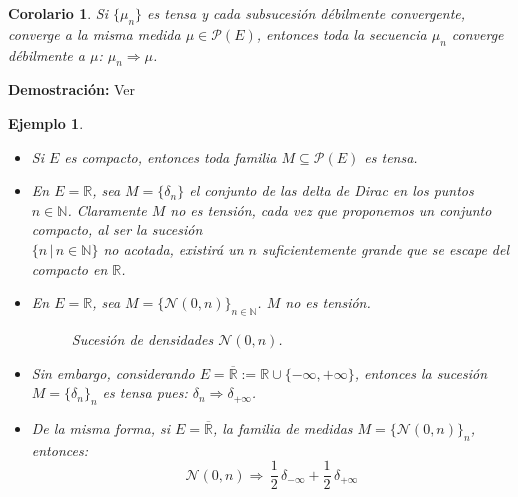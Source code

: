 \documentclass[a4paper]{article}
\newtheorem{ejemplo}{Ejemplo}
\newtheorem{cor}{Corolario}
\numberwithin{equation}{subsection}
\def\R{\mathbb R}
\def\N{\mathbb N}
\begin{document}
\begin{cor} Si $\{\mu_n\}$ es tensa y cada subsucesión débilmente convergente, converge a la misma medida $\mu\in\mathcal{P}(E)$, entonces toda la secuencia $\mu_n$ converge débilmente a $\mu$: $\mu_n \Rightarrow \mu$.
\end{cor}
\textbf{Demostración:} Ver \cite[págs. 59,69]{Bill}
\begin{ejemplo}
\begin{itemize}
    \item Si $E$ es compacto, entonces toda familia $M\subseteq \mathcal{P}(E)$ es tensa.
    \item En $E=\R$, sea $M=\{\delta_n \}$ el conjunto de las delta de Dirac en los puntos $n\in\N$. Claramente $M$ no es tensión, cada vez que proponemos un conjunto compacto, al ser la sucesión \\$\{n\,|\, n\in\N\}$ no acotada, existirá un $n$ suficientemente grande que se escape del compacto en $\R$. 
    \item En $E=\R$, sea $M=\{\mathcal{N}(0,n)\}_{n\in\N}$. $M$ no es tensión.
\begin{figure}[h!]
\centering
    \caption{Sucesión de densidades $\mathcal{N}(0,n)$.}
\end{figure}

    \item Sin embargo, considerando $E=\overline{\R}:=\R\cup \{-\infty ,+\infty\}$, entonces la sucesión $M=\{\delta_n \}_n$ es tensa pues: $\delta_n \Rightarrow \delta_{+\infty}$.
    
    \item De la misma forma, si $E=\overline{\R}$, la familia de medidas $M=\{\mathcal{N}(0,n)\}_n$, entonces:
    \[\mathcal{N}(0,n) \Rightarrow\,\frac{1}{2}\,\delta_{-\infty} + \frac{1}{2}\,\delta_{+\infty}\]
\end{itemize}
\end{ejemplo}
\end{document}
